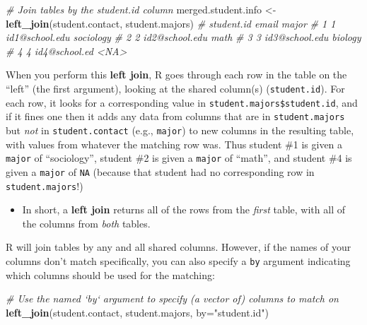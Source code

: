\documentclass[]{book}
\newenvironment{Shaded}{\begin{snugshade}}{\end{snugshade}}
\newcommand{\KeywordTok}[1]{\textcolor[rgb]{0.13,0.29,0.53}{\textbf{#1}}}
\newcommand{\DataTypeTok}[1]{\textcolor[rgb]{0.13,0.29,0.53}{#1}}
\newcommand{\StringTok}[1]{\textcolor[rgb]{0.31,0.60,0.02}{#1}}
\newcommand{\CommentTok}[1]{\textcolor[rgb]{0.56,0.35,0.01}{\textit{#1}}}
\newcommand{\NormalTok}[1]{#1}
\providecommand{\tightlist}{%
  \setlength{\itemsep}{0pt}\setlength{\parskip}{0pt}}
\theoremstyle{definition}
\theoremstyle{definition}
\theoremstyle{remark}
\begin{document}
\begin{Shaded}
\begin{Highlighting}[]
\CommentTok{# Join tables by the student.id column}
\NormalTok{merged.student.info <-}\StringTok{ }\KeywordTok{left_join}\NormalTok{(student.contact, student.majors)}
                        \CommentTok{#    student.id          email     major}
                        \CommentTok{# 1          1 id1@school.edu sociology}
                        \CommentTok{# 2          2 id2@school.edu      math}
                        \CommentTok{# 3          3 id3@school.edu   biology}
                        \CommentTok{# 4          4  id4@school.ed      <NA>}
\end{Highlighting}
\end{Shaded}

When you perform this \textbf{left join}, R goes through each row in the
table on the ``left'' (the first argument), looking at the shared
column(s) (\texttt{student.id}). For each row, it looks for a
corresponding value in \texttt{student.majors\$student.id}, and if it
fines one then it adds any data from columns that are in
\texttt{student.majors} but \emph{not} in \texttt{student.contact}
(e.g., \texttt{major}) to new columns in the resulting table, with
values from whatever the matching row was. Thus student \#1 is given a
\texttt{major} of ``sociology'', student \#2 is given a \texttt{major}
of ``math'', and student \#4 is given a \texttt{major} of \texttt{NA}
(because that student had no corresponding row in
\texttt{student.majors}!)

\begin{itemize}
\tightlist
\item
  In short, a \textbf{left join} returns all of the rows from the
  \emph{first} table, with all of the columns from \emph{both} tables.
\end{itemize}

R will join tables by any and all shared columns. However, if the names
of your columns don't match specifically, you can also specify a
\texttt{by} argument indicating which columns should be used for the
matching:

\begin{Shaded}
\begin{Highlighting}[]
\CommentTok{# Use the named `by` argument to specify (a vector of) columns to match on}
\KeywordTok{left_join}\NormalTok{(student.contact, student.majors, }\DataTypeTok{by=}\StringTok{"student.id"}\NormalTok{)}
\end{Highlighting}
\end{Shaded}
\end{document}
